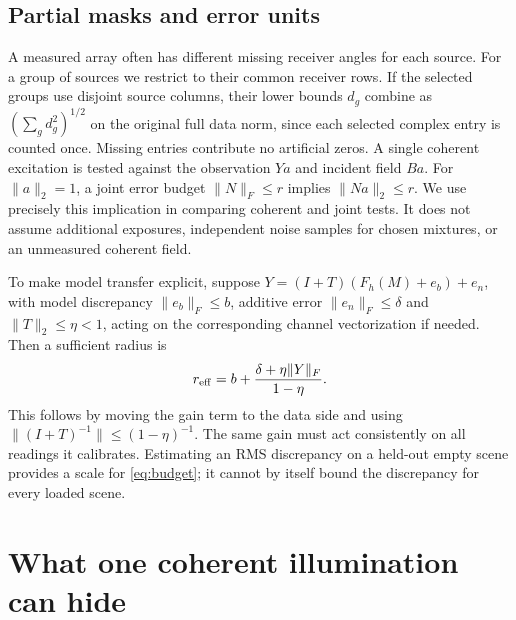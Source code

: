 \documentclass[anonymous,12pt]{iopjournal}
\theoremstyle{remark}\newtheorem{remark}[theorem]{Remark}
\numberwithin{equation}{section}
\begin{document}
\subsection{Partial masks and error units}
A measured array often has different missing receiver angles for each source. For a group of sources we restrict to their common receiver rows. If the selected groups use disjoint source columns, their lower bounds $d_g$ combine as $(\sum_g d_g^2)^{1/2}$ on the original full data norm, since each selected complex entry is counted once. Missing entries contribute no artificial zeros. A single coherent excitation is tested against the observation $Ya$ and incident field $Ba$. For $\|a\|_2=1$, a joint error budget $\|N\|_F\le r$ implies $\|Na\|_2\le r$. We use precisely this implication in comparing coherent and joint tests. It does not assume additional exposures, independent noise samples for chosen mixtures, or an unmeasured coherent field.

To make model transfer explicit, suppose $Y=(I+T)(F_h(M)+e_b)+e_n$, with model discrepancy $\|e_b\|_F\le b$, additive error $\|e_n\|_F\le\delta$ and $\|T\|_2\le\eta<1$, acting on the corresponding channel vectorization if needed. Then a sufficient radius is
\begin{equation}
 r_{\rm eff}=b+\frac{\delta+\eta\|Y\|_F}{1-\eta}.\label{eq:budget}
\end{equation}
This follows by moving the gain term to the data side and using $\|(I+T)^{-1}\|\le(1-\eta)^{-1}$. The same gain must act consistently on all readings it calibrates. Estimating an RMS discrepancy on a held-out empty scene provides a scale for \eqref{eq:budget}; it cannot by itself bound the discrepancy for every loaded scene.

\section{What one coherent illumination can hide}\label{sec:single}
\end{document}
